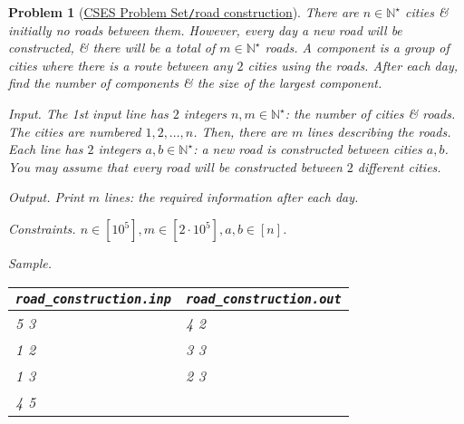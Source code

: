 \documentclass{article}
\newtheorem{problem}{Problem}
\begin{document}
\begin{problem}[\href{https://cses.fi/problemset/task/1676}{CSES Problem Set{\tt/}road construction}]
    There are $n\in\mathbb{N}^\star$ cities \& initially no roads between them. However, every day a new road will be constructed, \& there will be a total of $m\in\mathbb{N}^\star$ roads. A component is a group of cities where there is a route between any $2$ cities using the roads. After each day, find the number of components \& the size of the largest component.
    \item {\sf Input.} The 1st input line has $2$ integers $n,m\in\mathbb{N}^\star$: the number of cities \& roads. The cities are numbered $1,2,\ldots,n$. Then, there are $m$ lines describing the roads. Each line has $2$ integers $a,b\in\mathbb{N}^\star$: a new road is constructed between cities $a,b$. You may assume that every road will be constructed between $2$ different cities.
    \item {\sf Output.} Print $m$ lines: the required information after each day.
    \item {\sf Constraints.} $n\in[10^5],m\in[2\cdot10^5],a,b\in[n]$.
    \item {\sf Sample.}
    \begin{table}[H]
        \centering
        \begin{tabular}{|l|l|}
            \hline
            \verb|road_construction.inp| & \verb|road_construction.out| \\
            \hline
            5 3 & 4 2 \\
            1 2 & 3 3 \\
            1 3 & 2 3 \\
            4 5 & \\
            \hline
        \end{tabular}
    \end{table}
\end{problem}
\end{document}
